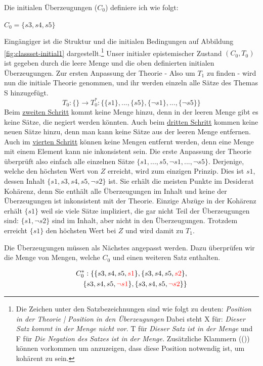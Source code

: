 \documentclass{article}
\begin{document}
 Die initialen Überzeugungen ($C_0$) definiere ich wie folgt:
 
 $C_0 = \{s3, s4, s5\}$
 
 Eingängiger ist die Struktur und die initialen Bedingungen auf Abbildung \ref{fig:classset-initial1} dargestellt.\footnote{Die Zeichen unter den Satzbezeichnungen sind wie folgt zu deuten: \textit{Position in der Theorie | Position in den Überzeugungen} Dabei steht X für: \textit{Dieser Satz kommt in der Menge nicht vor}. T für \textit{Dieser Satz ist in der Menge} und F für \textit{Die Negation des Satzes ist in der Menge.} Zusätzliche Klammern (()) können vorkommen um anzuzeigen, dass diese Position notwendig ist, um kohärent zu sein.}
 Unser initialer epistemischer Zustand $(C_0, T_0)$ ist gegeben durch die leere Menge und die oben definierten initialen Überzeugungen. Zur ersten Anpassung der Theorie - Also um $T_1$ zu finden - wird nun die initiale Theorie genommen, und ihr werden einzeln alle Sätze des Themas S hinzugefügt.
 $$
 T_0: \{\} \longrightarrow T_0^*: \{\{s1\},...,\{s5\}, \{\neg s1\}, ..., \{\neg s5\}\}
 $$
 Beim \hyperref[1.1]{zweiten Schritt} kommt keine Menge hinzu, denn in der leeren Menge gibt es keine Sätze, die negiert werden könnten. Auch beim \hyperref[2]{dritten Schritt} kommen keine neuen Sätze hinzu, denn man kann keine Sätze aus der leeren Menge entfernen. Auch im \hyperref[konsistenzfilter]{vierten Schritt} können keine Mengen entfernt werden, denn eine Menge mit einem Element kann nie inkonsistent sein. Die erste Anpassung der Theorie überprüft also einfach alle einzelnen Sätze $\{s1,...,s5, \neg s1, ..., \neg s5\}$. Derjenige, welche den höchsten Wert von $Z$ erreicht, wird zum einzigen Prinzip. Dies ist $s1$, dessen Inhalt $\{s1,s3,s4,s5,\neg s2\}$ ist. Sie erhält die meisten Punkte im Desiderat Kohärenz, denn Sie enthält alle Überzeugungen im Inhalt und keine der Überzeugungen ist inkonsistent mit der Theorie. Einzige Abzüge in der Kohärenz erhält $\{s1\}$ weil sie viele Sätze impliziert, die gar nicht Teil der Überzeugungen sind: $\{s1, \neg s2\}$ sind im Inhalt, aber nicht in den Überzeugungen. Trotzdem erreicht $\{s1\}$ den höchsten Wert bei $Z$ und wird damit zu $T_1$.
 
 Die Überzeugungen müssen als Nächstes angepasst werden. Dazu überprüfen wir die Menge von Mengen, welche $C_0$ und einen weiteren Satz enthalten.
 
 \begin{equation} \notag
 \begin{split}
 C_0^*: \{\{s3, s4, s5, \textcolor{red}{s1}\}, \{s3, s4, s5, \textcolor{red}{s2}\}, \\
 \{s3, s4, s5, \textcolor{red}{\neg s1}\}, \{s3, s4, s5, \textcolor{red}{\neg s2}\}\}
 \end{split}
 \end{equation}
 
\end{document}
